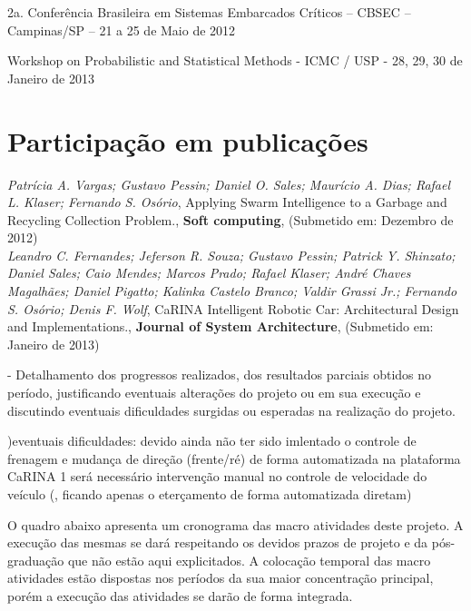 \documentclass{article}
\begin{document}
2a. Conferência Brasileira em Sistemas Embarcados Críticos – CBSEC – Campinas/SP
– 21 a 25 de Maio de 2012

Workshop on Probabilistic and Statistical Methods - ICMC / USP - 28, 29, 30 de
Janeiro de 2013


\section{Participação em publicações}

\textit{Patrícia A. Vargas; Gustavo Pessin; Daniel O. Sales; Maurício A. Dias;
Rafael L. Klaser; Fernando S. Osório},
Applying Swarm Intelligence to a Garbage and Recycling Collection Problem.,
\textbf{Soft computing}, (Submetido em: Dezembro de 2012)
\\

\textit{Leandro C. Fernandes; Jeferson R. Souza; Gustavo Pessin; Patrick Y.
Shinzato; Daniel Sales; Caio Mendes; Marcos Prado; Rafael Klaser; André Chaves
Magalhães; Daniel Pigatto; Kalinka Castelo Branco; Valdir Grassi Jr.; Fernando
S. Osório; Denis F. Wolf},
CaRINA Intelligent Robotic Car:
Architectural Design and Implementations., \textbf{Journal of System
Architecture}, (Submetido em: Janeiro de 2013)




- Detalhamento dos progressos realizados, dos resultados parciais obtidos no
período, justificando eventuais alterações do projeto ou em sua execução e
discutindo eventuais dificuldades surgidas ou esperadas na realização do
projeto.


)eventuais dificuldades: devido ainda não ter sido imlentado o controle de
frenagem e mudança de direção (frente/ré) de forma automatizada na plataforma
CaRINA 1 será necessário intervenção manual no controle de velocidade do
veículo (, ficando apenas o eterçamento de forma automatizada diretam)



O quadro abaixo apresenta um cronograma das macro atividades deste projeto. A
execução das mesmas se dará respeitando os devidos prazos de projeto e da
pós-graduação que não estão aqui explicitados. A colocação temporal das macro
atividades estão dispostas nos períodos da sua maior concentração principal,
porém a execução das atividades se darão de forma integrada.
\end{document}
